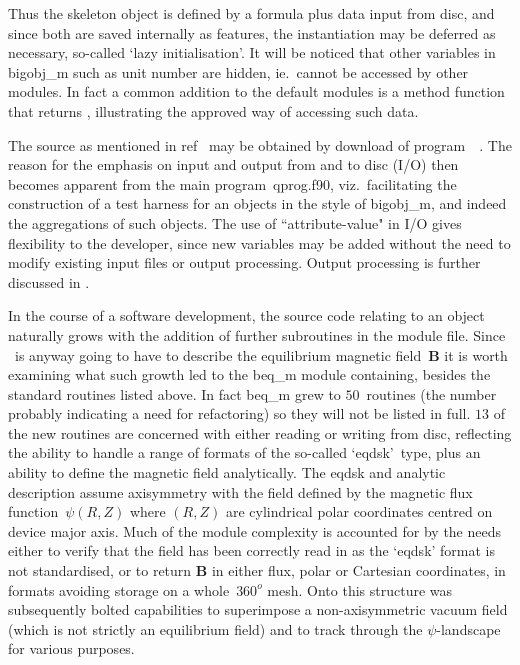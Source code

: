Thus the skeleton object is defined by a formula plus data input from disc,
and since both are saved internally as features, the instantiation may be deferred as necessary,
so-called `lazy initialisation'.
It will be noticed that other variables in bigobj\_m such as unit number are hidden, ie.\ cannot be accessed by
other modules. In fact a common addition to the default modules is a method function  that returns ,
illustrating the approved way of accessing such data.

The source as mentioned in ref~\cite{y2re333} may be obtained by download of
program~~\cite{qprogwebsite}. The reason for the emphasis on input and output from and to disc (I/O)
then becomes apparent from the main program~qprog.f90, viz.\  facilitating the construction of a test harness
for an objects in the style of bigobj\_m, and indeed the aggregations of such objects.  
The use of ``attribute-value" in I/O gives flexibility to the developer, since new variables may be
added without the need to modify existing input files or output processing. Output processing is further
discussed in .

In the course of a software development, the source code relating to an object naturally grows
with the addition of further subroutines in the module file.
Since \nep\ is anyway going to have to describe the equilibrium magnetic field~${\mathbf B}$ it
is worth examining what such growth led to the beq\_m  module containing,
besides the standard routines listed above.
In fact beq\_m grew to $50$~routines (the number probably indicating a need for refactoring) so they will
not be listed in full. $13$ of the new routines are concerned with either reading or writing from disc,
reflecting the ability to handle a range of formats of the so-called `eqdsk'~type, plus an ability
to define the magnetic field analytically. The eqdsk and analytic description assume axisymmetry
with the field defined by the magnetic flux function~$\psi(R,Z)$ where $(R,Z)$ are cylindrical polar coordinates
centred on device major axis. Much of the module complexity is accounted for by the needs either to verify
that the field has been correctly read in as the `eqdsk' format is not standardised, or
to return ${\mathbf B}$ in either flux, polar or Cartesian coordinates,  in formats avoiding storage on
a whole~$360^o$ mesh. Onto this structure
was subsequently bolted capabilities to superimpose a non-axisymmetric vacuum field (which is not strictly an
equilibrium field) and to track through the $\psi$-landscape for various purposes.

